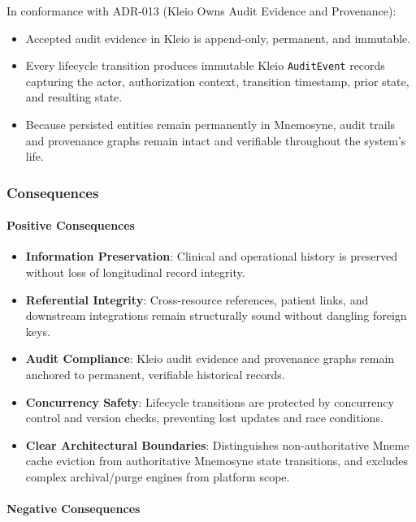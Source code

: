 In conformance with ADR-013 (Kleio Owns Audit Evidence and Provenance):

\begin{itemize}
    \item Accepted audit evidence in Kleio is append-only, permanent, and immutable.
    \item Every lifecycle transition produces immutable Kleio \texttt{AuditEvent} records capturing the actor, authorization context, transition timestamp, prior state, and resulting state.
    \item Because persisted entities remain permanently in Mnemosyne, audit trails and provenance graphs remain intact and verifiable throughout the system's life.
\end{itemize}

\subsubsection{Consequences}

\paragraph{Positive Consequences}

\begin{itemize}
    \item \textbf{Information Preservation}: Clinical and operational history is preserved without loss of longitudinal record integrity.
    \item \textbf{Referential Integrity}: Cross-resource references, patient links, and downstream integrations remain structurally sound without dangling foreign keys.
    \item \textbf{Audit Compliance}: Kleio audit evidence and provenance graphs remain anchored to permanent, verifiable historical records.
    \item \textbf{Concurrency Safety}: Lifecycle transitions are protected by concurrency control and version checks, preventing lost updates and race conditions.
    \item \textbf{Clear Architectural Boundaries}: Distinguishes non-authoritative Mneme cache eviction from authoritative Mnemosyne state transitions, and excludes complex archival/purge engines from platform scope.
\end{itemize}

\paragraph{Negative Consequences}

